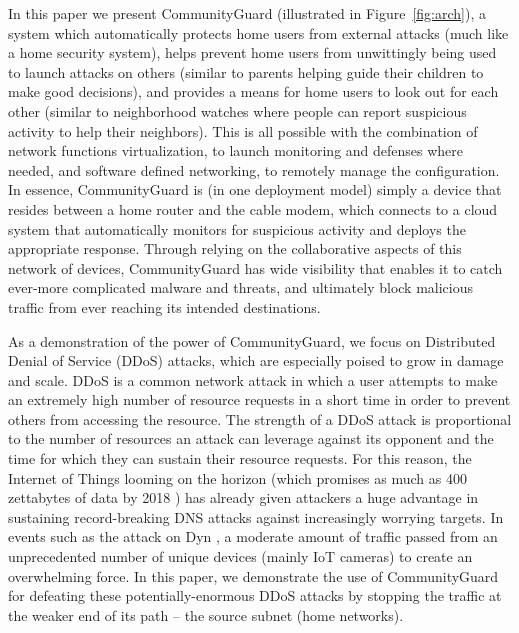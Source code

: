 In this paper we present CommunityGuard (illustrated in Figure~\ref{fig:arch}), a system which automatically protects home users from external attacks (much like a home security system), helps prevent home users from unwittingly being used to launch attacks on others (similar to parents helping guide their children to make good decisions), and provides a means for home users to look out for each other (similar to neighborhood watches where people can report suspicious activity to help their neighbors).  This is all possible with the combination of network functions virtualization, to launch monitoring and defenses where needed, and software defined networking, to remotely manage the configuration.  In essence, CommunityGuard is (in one deployment model) simply a device that resides between a home router and the cable modem, which connects to a cloud system that automatically monitors for suspicious activity and deploys the appropriate response.  Through relying on the collaborative aspects of this network of devices, CommunityGuard has wide visibility that enables it to catch ever-more complicated malware and threats, and ultimately block malicious traffic from ever reaching its intended destinations. 

As a demonstration of the power of CommunityGuard, we focus on Distributed Denial of Service (DDoS) attacks, which are especially poised to grow in damage and scale.  DDoS is a common network attack in which a user attempts to make an extremely high number of resource requests in a short time in order to prevent others from accessing the resource. The strength of a DDoS attack is proportional to the number of resources an attack can leverage against its opponent and the time for which they can sustain their resource requests. For this reason, the Internet of Things looming on the horizon (which promises as much as 400 zettabytes of data by 2018 \cite{zetta}) has already given attackers a huge advantage in sustaining record-breaking DNS attacks against increasingly worrying targets. In events such as the attack on Dyn \cite{dyn}, a moderate amount of traffic passed from an unprecedented number of unique devices (mainly IoT cameras) to create an overwhelming force.  In this paper, we demonstrate the use of CommunityGuard for defeating these potentially-enormous DDoS attacks by stopping the traffic at the weaker end of its path -- the source subnet (home networks). 




